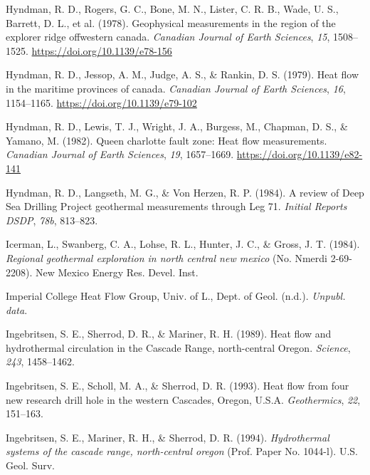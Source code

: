 \documentclass[draft,linenumbers]{agujournal2018}
\begin{document}
\leavevmode{}%
Hyndman, R. D., Rogers, G. C., Bone, M. N., Lister, C. R. B., Wade, U.
S., Barrett, D. L., et al. (1978). Geophysical measurements in the
region of the explorer ridge offwestern canada. \emph{Canadian Journal
of Earth Sciences}, \emph{15}, 1508--1525.
\url{https://doi.org/10.1139/e78-156}

\leavevmode{}%
Hyndman, R. D., Jessop, A. M., Judge, A. S., \& Rankin, D. S. (1979).
Heat flow in the maritime provinces of canada. \emph{Canadian Journal of
Earth Sciences}, \emph{16}, 1154--1165.
\url{https://doi.org/10.1139/e79-102}

\leavevmode{}%
Hyndman, R. D., Lewis, T. J., Wright, J. A., Burgess, M., Chapman, D.
S., \& Yamano, M. (1982). Queen charlotte fault zone: Heat flow
measurements. \emph{Canadian Journal of Earth Sciences}, \emph{19},
1657--1669. \url{https://doi.org/10.1139/e82-141}

\leavevmode{}%
Hyndman, R. D., Langseth, M. G., \& Von Herzen, R. P. (1984). A review
of {Deep Sea Drilling Project} geothermal measurements through {Leg 71}.
\emph{Initial Reports DSDP}, \emph{78b}, 813--823.

\leavevmode{}%
Icerman, L., Swanberg, C. A., Lohse, R. L., Hunter, J. C., \& Gross, J.
T. (1984). \emph{Regional geothermal exploration in north central new
mexico} (No. Nmerdi 2-69-2208). New Mexico Energy Res. Devel. Inst.

\leavevmode{}%
Imperial College Heat Flow Group, Univ. of L., Dept. of Geol. (n.d.).
\emph{Unpubl. data}.

\leavevmode{}%
Ingebritsen, S. E., Sherrod, D. R., \& Mariner, R. H. (1989). Heat flow
and hydrothermal circulation in the {Cascade Range, north-central
Oregon}. \emph{Science}, \emph{243}, 1458--1462.

\leavevmode{}%
Ingebritsen, S. E., Scholl, M. A., \& Sherrod, D. R. (1993). Heat flow
from four new research drill hole in the western {Cascades, Oregon,
U.S.A.} \emph{Geothermics}, \emph{22}, 151--163.

\leavevmode{}%
Ingebritsen, S. E., Mariner, R. H., \& Sherrod, D. R. (1994).
\emph{Hydrothermal systems of the cascade range, north-central oregon}
(Prof. Paper No. 1044-l). U.S. Geol. Surv.
\end{document}
